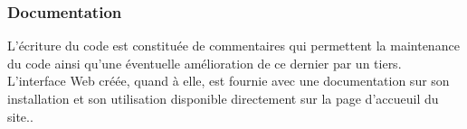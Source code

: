 \subsubsection{Documentation}
L'écriture du code est constituée de commentaires qui permettent la maintenance du code ainsi qu'une éventuelle amélioration de ce dernier par un tiers.\\
L'interface Web créée, quand à elle, est fournie avec une documentation sur son installation et son utilisation disponible directement sur la page d'accueuil du site..
